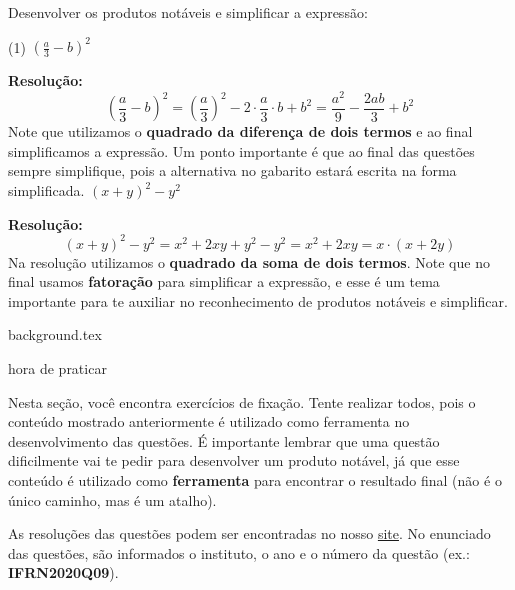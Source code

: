 \documentclass[fleqn,10pt]{article}
\begin{document}

\begin{Exercicio}
Desenvolver os produtos notáveis e simplificar a expressão:
\begin{tasks}(1)
        \task \( \left( \frac{a}{3}-b \right)^2 \)
        
        {\bf Resolução:}
            \[ \left( \frac{a}{3}-b \right)^2 = \left( \frac{a}{3} \right)^2 - 2 \cdot \frac{a}{3} \cdot b + b^2 = \frac{a^2}{9} - \frac{2ab}{3} + b^2 \]
        Note que utilizamos o \textbf{quadrado da diferença de dois termos} e ao final simplificamos a expressão. Um ponto importante é que ao final das questões sempre simplifique, pois a alternativa no gabarito estará escrita na forma simplificada.
        \task \( ( x + y )^2 - y^2 \)
        
        {\bf Resolução:}
            \[ ( x + y )^2 - y^2 = x^2+2xy+y^2 -y^2 = x^2+2xy = x \cdot (x+2y) \]
        Na resolução utilizamos o \textbf{quadrado da soma de dois termos}. Note que no final usamos \textbf{fatoração} para simplificar a expressão, e esse é um tema importante para te auxiliar no reconhecimento de produtos notáveis e simplificar. 
    \end{tasks}
\end{Exercicio}

\newpage
{background.tex} %

 \begin{center}
            {\LARGE {\sc hora de praticar}}
        \end{center}

Nesta seção, você encontra exercícios de fixação. Tente realizar todos, pois o conteúdo mostrado anteriormente é utilizado como ferramenta no desenvolvimento das questões. É importante lembrar que uma questão dificilmente vai te pedir para desenvolver um produto notável, já que esse conteúdo é utilizado como \textbf{ferramenta} para encontrar o resultado final (não é o único caminho, mas é um atalho).

As resoluções das questões podem ser encontradas no nosso \href{https://prepif.herokuapp.com/instituicoes}{site}. No enunciado das questões, são informados o instituto, o ano e o número da questão (ex.: \textbf{IFRN2020Q09}).
\end{document}
